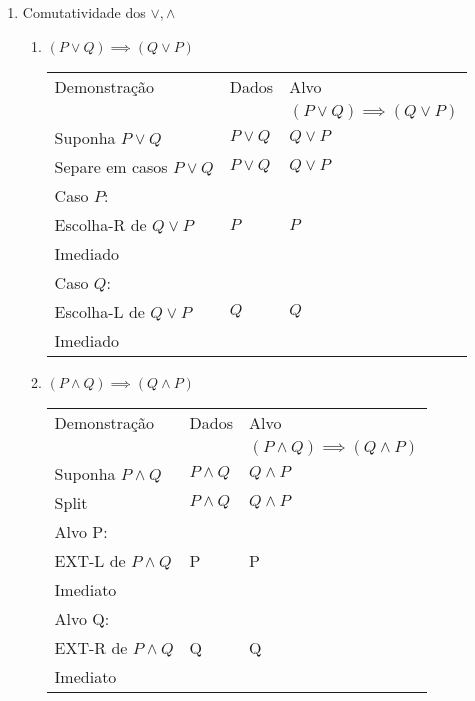 \documentclass[a4paper, 12pt]{article}
\begin{document}
\begin{enumerate}
\begin{enumerate}[1.]
    \end{enumerate}
    \item Comutatividade dos $\lor ,\land$
    \begin{enumerate}[1.]
        \item $(P \lor Q) \implies (Q \lor P)$
        \begin{table}[h!]
            \centering
            \begin{tabular}{|p{4cm} | p{4cm} | p{4cm} |}
            \rowcolor{gray!50}
            Demonstração & Dados & Alvo \\
            & & $(P \lor Q) \implies (Q \lor P)$ \\
            Suponha $P \lor Q$ & $P \lor Q$ & $Q \lor P$ \\
            Separe em casos $P \lor Q$ & $P \lor Q$ & $Q \lor P$ \\
            \hline
            Caso $P$: && \\
            Escolha-R de $Q \lor P$  & $P$ & $P$ \\
            Imediado & & \\
            \hline
            Caso $Q$: && \\
            Escolha-L de $Q \lor P$  & $Q$ & $Q$ \\
            Imediado & & \\
            \hline
            \end{tabular}
        \end{table}

        \newpage
        \item $(P \land Q) \implies (Q \land P)$
        \begin{table}[h!]
            \centering
            \begin{tabular}{|p{4cm} | p{4cm} | p{4cm} |}
            \rowcolor{gray!50}
            Demonstração & Dados & Alvo \\
            & & $(P \land Q) \implies (Q \land P)$\\
            Suponha $P \land Q$ & $P \land Q$ & $Q \land P$\\
            Split & $P \land Q$ & $Q \land P$ \\
            \hline
            Alvo P: & & \\
            EXT-L de $P \land Q$ & P & P \\
            Imediato & & \\
            \hline
            Alvo Q: & & \\
            EXT-R de $P \land Q$ & Q & Q \\
            Imediato & & \\
            \hline
            \end{tabular}
        \end{table}
    \end{enumerate}


\end{enumerate}
\end{document}
